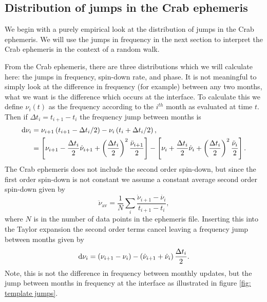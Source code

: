 \documentclass[../full_thesis/full_thesis.tex]{subfiles}
\begin{document}
{\subsection{Distribution of jumps in the Crab ephemeris}
\label{sec: jumps}
\newcommand{\nuddotav}{\ddot{\nu}_{\textrm{av}}}
We begin with a purely empirical look at the distribution of jumps in the
Crab ephemeris. We will use the jumps in frequency in the next section to interpret the
Crab ephemeris in the context of a random walk.

From the Crab ephemeris, there are three distributions which we will calculate
here: the jumps in frequency, spin-down rate, and phase. It is not meaningful
to simply look at the difference in frequency (for example) between any two
months, what we want is the difference which occurs at the interface. To
calculate this we define $\nu_{i}(t)$ as the frequency according to the
$i^{th}$ month as evaluated at time $t$. Then if $\Delta t_{i} = t_{i+1} -
t_{i}$ the frequency jump between months is
\begin{align}
\mathrm{d}\nu_{i} &= \nu_{i+1}\left(t_{i+1}-\Delta t_{i}/2\right) -  \nu_{i}\left(t_{i}+\Delta t_{i}/2\right), \\
    &= \left[\nu_{i+1}- \frac{\Delta t_{i}}{2}\dot{\nu}_{i+1} + \left(\frac{\Delta t_{i}}{2}\right)^{2}\frac{\ddot{\nu}_{i+1}}{2}\right]
     - \left[\nu_{i} + \frac{\Delta t_{i}}{2}\dot{\nu}_{i}+ \left(\frac{\Delta t_{i}}{2}\right)^{2}\frac{\ddot{\nu}_{i}}{2}\right] .
\end{align}
The Crab ephemeris does not include the second order spin-down, but since the
first order spin-down is not constant we assume a constant average second order
spin-down given by
\begin{equation}
   \nuddotav = \frac{1}{N}\sum_{i} \frac{\dot{\nu}_{i+1} - \dot{\nu_{i}}}{t_{i+1} - t_{i}},
   \label{eqn: average second order spin-down}
\end{equation}
where $N$ is in the number of data points in the ephemeris file. Inserting this
into the Taylor expansion the second order terms cancel leaving a frequency
jump between months given by
\begin{equation}
\mathrm{d}\nu_{i} = \left(\nu_{i+1}- \nu_{i}\right) -  \left(\dot{\nu}_{i+1}
               + \dot{\nu}_{i}\right)\frac{\Delta t_{i}}{2}.
\label{eqn: crab frequency residuals}
\end{equation}
Note, this is not the difference in frequency between monthly
updates, but the jump between months in frequency at the interface as illustrated in figure
\ref{fig: template jumps}.

}
\end{document}
